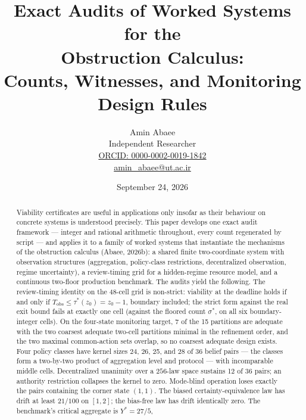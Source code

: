 \documentclass[10pt,twocolumn]{article}
\theoremstyle{definition}
\begin{document}
\title{Exact Audits of Worked Systems for the\\
Obstruction Calculus:\\
Counts, Witnesses, and Monitoring Design Rules}
\author{Amin Abaee\\[0.35em]
{\small Independent Researcher}\\[0.55em]
{\small\href{https://orcid.org/0000-0002-0019-1842}{ORCID: 0000-0002-0019-1842}}\\[0.3em]
{\small\href{mailto:amin\_abaee@ut.ac.ir}{amin\_abaee@ut.ac.ir}}}
\date{September 24, 2026}
\maketitle

\begin{abstract}
Viability certificates are useful in applications only insofar as their behaviour on concrete systems is understood precisely. This paper develops one exact audit framework --- integer and rational arithmetic throughout, every
count regenerated by script --- and applies it to a family of worked
systems that instantiate the mechanisms of the obstruction calculus
(Abaee, 2026b): a shared finite two-coordinate system with observation
structures (aggregation, policy-class restrictions, decentralized
observation, regime uncertainty), a review-timing grid for a
hidden-regime resource model, and a continuous two-floor production
benchmark. The audits yield the following. The review-timing identity on
the 48-cell grid is non-strict: viability at the deadline holds if and
only if \(T_{\mathrm{obs}} \le \tau^{*}(z_0) = z_0 - 1\), boundary included; the strict form against the real exit bound fails at exactly one cell (against the floored count \(\sigma^{*}\), on all six boundary-integer cells). On the four-state
monitoring target, 7 of the 15 partitions are adequate with the two coarsest adequate two-cell partitions minimal in the refinement order, and the two maximal common-action sets overlap, so
no coarsest adequate design exists. Four policy classes have kernel
sizes 24, 26, 25, and 28 of 36 belief pairs --- the classes form a two-by-two product of aggregation level and protocol --- with incomparable middle
cells. Decentralized unanimity over a
\(256\)-law space sustains 12 of 36 pairs; an authority restriction
collapses the kernel to zero. Mode-blind operation loses exactly the
pairs containing the corner state \((1,1)\). The biased certainty-equivalence law has
drift at least \(21/100\) on \([1,2]\); the bias-free law has drift
identically zero. The benchmark's critical aggregate is \(Y^{*} = 27/5\),

\end{abstract}
\end{document}
